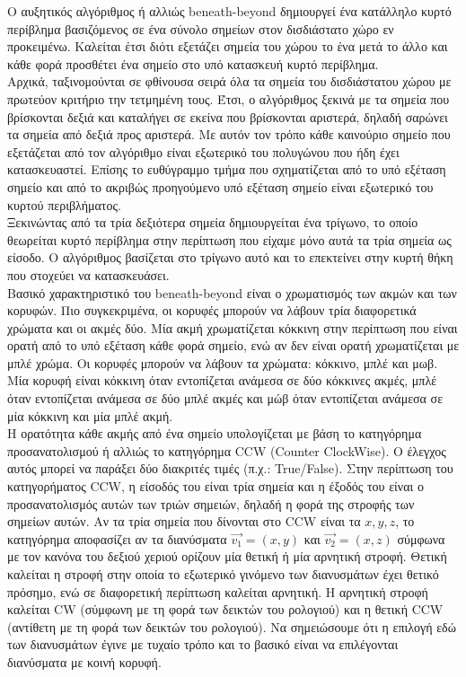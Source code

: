 \documentclass[oneside,12pt]{book}
\theoremstyle{definition}
\begin{document}
Ο αυξητικός αλγόριθμος ή αλλιώς beneath-beyond δημιουργεί ένα κατάλληλο κυρτό περίβλημα βασιζόμενος σε ένα σύνολο σημείων στον δισδιάστατο χώρο εν προκειμένω. Καλείται έτσι διότι εξετάζει σημεία του χώρου το ένα μετά το άλλο και κάθε φορά προσθέτει ένα σημείο στο υπό κατασκευή κυρτό περίβλημα. \\

Αρχικά, ταξινομούνται σε φθίνουσα σειρά όλα τα σημεία του δισδιάστατου χώρου με πρωτεύον κριτήριο την τετμημένη τους. Έτσι, ο αλγόριθμος ξεκινά με τα σημεία που βρίσκονται δεξιά και καταλήγει σε εκείνα που βρίσκονται αριστερά, δηλαδή σαρώνει τα σημεία από δεξιά προς αριστερά. Με αυτόν τον τρόπο κάθε καινούριο σημείο που εξετάζεται από τον αλγόριθμο είναι εξωτερικό του πολυγώνου που ήδη έχει κατασκευαστεί. Επίσης το ευθύγραμμο τμήμα που σχηματίζεται από το υπό εξέταση σημείο και από το ακριβώς προηγούμενο υπό εξέταση σημείο είναι εξωτερικό του κυρτού περιβλήματος. \\

Ξεκινώντας από τα τρία δεξιότερα σημεία δημιουργείται ένα τρίγωνο, το οποίο θεωρείται κυρτό περίβλημα στην περίπτωση που είχαμε μόνο αυτά τα τρία σημεία ως είσοδο. Ο αλγόριθμος βασίζεται στο τρίγωνο αυτό και το επεκτείνει στην κυρτή θήκη που στοχεύει να κατασκευάσει. \\

Βασικό χαρακτηριστικό του beneath-beyond είναι ο χρωματισμός των ακμών και των κορυφών. Πιο συγκεκριμένα, οι κορυφές μπορούν να λάβουν τρία διαφορετικά χρώματα και οι ακμές δύο. Μία ακμή χρωματίζεται κόκκινη στην περίπτωση που είναι ορατή από το υπό εξέταση κάθε φορά σημείο, ενώ αν δεν είναι ορατή χρωματίζεται με μπλέ χρώμα. Οι κορυφές μπορούν να λάβουν τα χρώματα: κόκκινο, μπλέ και μωβ. Μία κορυφή είναι κόκκινη όταν εντοπίζεται ανάμεσα σε δύο κόκκινες ακμές, μπλέ όταν εντοπίζεται ανάμεσα σε δύο μπλέ ακμές και μώβ όταν εντοπίζεται ανάμεσα σε μία κόκκινη και μία μπλέ ακμή. \\

Η ορατότητα κάθε ακμής από ένα σημείο υπολογίζεται με βάση το κατηγόρημα προσανατολισμού ή αλλιώς το κατηγόρημα CCW (Counter ClockWise). Ο έλεγχος αυτός μπορεί να παράξει δύο διακριτές τιμές (π.χ.: True/False). Στην περίπτωση του κατηγορήματος CCW, η είσοδός του είναι τρία σημεία και η έξοδός του είναι ο προσανατολισμός αυτών των τριών σημειών, δηλαδή η φορά της στροφής των σημείων αυτών. Αν τα τρία σημεία που δίνονται στο CCW είναι τα \(x,y,z\), το κατηγόρημα αποφασίζει αν τα διανύσματα \(\vec{v_1} = (x,y)\) και \(\vec{v_2} = (x,z)\) σύμφωνα με τον κανόνα του δεξιού χεριού ορίζουν μία θετική ή μία αρνητική στροφή. Θετική καλείται η στροφή στην οποία το εξωτερικό γινόμενο των διανυσμάτων έχει θετικό πρόσημο, ενώ σε διαφορετική περίπτωση καλείται αρνητική. Η αρνητική στροφή καλείται CW (σύμφωνη με τη φορά των δεικτών του ρολογιού) και η θετική CCW (αντίθετη με τη φορά των δεικτών του ρολογιού). Να σημειώσουμε ότι η επιλογή εδώ των διανυσμάτων έγινε με τυχαίο τρόπο και το βασικό είναι να επιλέγονται διανύσματα με κοινή κορυφή. \\
\end{document}

